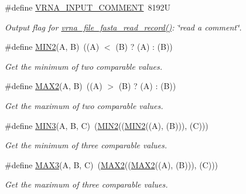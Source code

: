 \begin{DoxyCompactItemize}
\#define \mbox{\hyperlink{group__utils_gaf2062e0eeefffd3ed639af460b3d4fab}{V\+R\+N\+A\+\_\+\+I\+N\+P\+U\+T\+\_\+\+C\+O\+M\+M\+E\+NT}}~8192U
\begin{DoxyCompactList}\small\item\em Output flag for \mbox{\hyperlink{group__file__formats_ga8cfb7e271efc9e1f34640acb85475639}{vrna\+\_\+file\+\_\+fasta\+\_\+read\+\_\+record()}}\+: {\itshape \char`\"{}read a comment\char`\"{}}. \end{DoxyCompactList}\item 
\mbox{\label{group__utils_gae0b9cd0ce090bd69b951aa73e8fa4f7d}} 
\#define \mbox{\hyperlink{group__utils_gae0b9cd0ce090bd69b951aa73e8fa4f7d}{M\+I\+N2}}(A,  B)~((A) $<$ (B) ? (A) \+: (B))
\begin{DoxyCompactList}\small\item\em Get the minimum of two comparable values. \end{DoxyCompactList}\item 
\mbox{\label{group__utils_ga33297b3679c713b0c4d897cd0fe3b122}} 
\#define \mbox{\hyperlink{group__utils_ga33297b3679c713b0c4d897cd0fe3b122}{M\+A\+X2}}(A,  B)~((A) $>$ (B) ? (A) \+: (B))
\begin{DoxyCompactList}\small\item\em Get the maximum of two comparable values. \end{DoxyCompactList}\item 
\mbox{\label{group__utils_ga721b8d5f3abef17f10293f1f7f8c958e}} 
\#define \mbox{\hyperlink{group__utils_ga721b8d5f3abef17f10293f1f7f8c958e}{M\+I\+N3}}(A,  B,  C)~(\mbox{\hyperlink{group__utils_gae0b9cd0ce090bd69b951aa73e8fa4f7d}{M\+I\+N2}}((\mbox{\hyperlink{group__utils_gae0b9cd0ce090bd69b951aa73e8fa4f7d}{M\+I\+N2}}((A), (B))), (C)))
\begin{DoxyCompactList}\small\item\em Get the minimum of three comparable values. \end{DoxyCompactList}\item 
\mbox{\label{group__utils_ga8d577123d2e66d2b7d0bf9af6e172b93}} 
\#define \mbox{\hyperlink{group__utils_ga8d577123d2e66d2b7d0bf9af6e172b93}{M\+A\+X3}}(A,  B,  C)~(\mbox{\hyperlink{group__utils_ga33297b3679c713b0c4d897cd0fe3b122}{M\+A\+X2}}((\mbox{\hyperlink{group__utils_ga33297b3679c713b0c4d897cd0fe3b122}{M\+A\+X2}}((A), (B))), (C)))
\begin{DoxyCompactList}\small\item\em Get the maximum of three comparable values. \end{DoxyCompactList}\end{DoxyCompactItemize}
